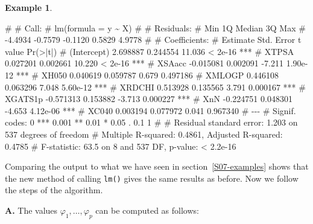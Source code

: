 \documentclass[
  a4paper,
]{article}
\newenvironment{Shaded}{\begin{snugshade}}{\end{snugshade}}
\newcommand{\CommentTok}[1]{\textcolor[rgb]{0.56,0.35,0.01}{\textit{#1}}}
\newcommand{\FunctionTok}[1]{\textcolor[rgb]{0.00,0.00,0.00}{#1}}
\newcommand{\NormalTok}[1]{#1}
\newcommand{\OtherTok}[1]{\textcolor[rgb]{0.56,0.35,0.01}{#1}}
\newcommand{\SpecialCharTok}[1]{\textcolor[rgb]{0.00,0.00,0.00}{#1}}
\theoremstyle{definition}
\theoremstyle{definition}
\newtheorem{example}{Example}[section]
\theoremstyle{definition}
\theoremstyle{definition}
\theoremstyle{remark}
\begin{document}
\begin{example}
\begin{Shaded}
\end{Shaded}

\begin{Shaded}
\begin{Highlighting}[]
\NormalTok{\# }
\NormalTok{\# Call:}
\NormalTok{\# lm(formula = y \textasciitilde{} X)}
\NormalTok{\# }
\NormalTok{\# Residuals:}
\NormalTok{\#     Min      1Q  Median      3Q     Max }
\NormalTok{\# {-}4.4934 {-}0.7579 {-}0.1120  0.5829  4.9778 }
\NormalTok{\# }
\NormalTok{\# Coefficients:}
\NormalTok{\#              Estimate Std. Error t value Pr(\textgreater{}|t|)    }
\NormalTok{\# (Intercept)  2.698887   0.244554  11.036  \textless{} 2e{-}16 ***}
\NormalTok{\# XTPSA        0.027201   0.002661  10.220  \textless{} 2e{-}16 ***}
\NormalTok{\# XSAacc      {-}0.015081   0.002091  {-}7.211 1.90e{-}12 ***}
\NormalTok{\# XH050        0.040619   0.059787   0.679 0.497186    }
\NormalTok{\# XMLOGP       0.446108   0.063296   7.048 5.60e{-}12 ***}
\NormalTok{\# XRDCHI       0.513928   0.135565   3.791 0.000167 ***}
\NormalTok{\# XGATS1p     {-}0.571313   0.153882  {-}3.713 0.000227 ***}
\NormalTok{\# XnN         {-}0.224751   0.048301  {-}4.653 4.12e{-}06 ***}
\NormalTok{\# XC040        0.003194   0.077972   0.041 0.967340    }
\NormalTok{\# {-}{-}{-}}
\NormalTok{\# Signif. codes:  0 \textquotesingle{}***\textquotesingle{} 0.001 \textquotesingle{}**\textquotesingle{} 0.01 \textquotesingle{}*\textquotesingle{} 0.05 \textquotesingle{}.\textquotesingle{} 0.1 \textquotesingle{} \textquotesingle{} 1}
\NormalTok{\# }
\NormalTok{\# Residual standard error: 1.203 on 537 degrees of freedom}
\NormalTok{\# Multiple R{-}squared:  0.4861,  Adjusted R{-}squared:  0.4785 }
\NormalTok{\# F{-}statistic:  63.5 on 8 and 537 DF,  p{-}value: \textless{} 2.2e{-}16}
\end{Highlighting}
\end{Shaded}

Comparing the output to what we have seen in section~\ref{S07-examples}
shows that the new method of calling \texttt{lm()} gives the same results
as before. Now we follow the steps of the algorithm.

\textbf{A.} The values \(\varphi_1, \ldots, \varphi_p\) can be computed as follows:


\end{example}
\end{document}
